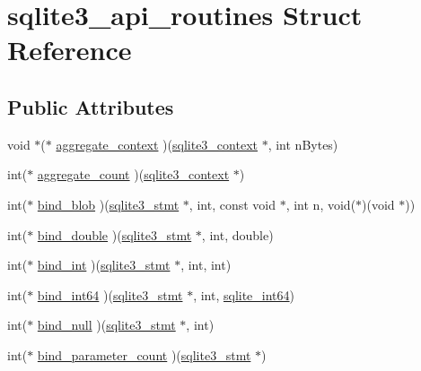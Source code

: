 \hypertarget{structsqlite3__api__routines}{\section{sqlite3\-\_\-api\-\_\-routines Struct Reference}
\label{structsqlite3__api__routines}
}
\subsection*{Public Attributes}
\begin{DoxyCompactItemize}
\item 
void $\ast$($\ast$ \hyperlink{structsqlite3__api__routines_a4af9ccf21e07862a8c3636c16d3acd19}{aggregate\-\_\-context} )(\hyperlink{structsqlite3__context}{sqlite3\-\_\-context} $\ast$, int n\-Bytes)
\item 
int($\ast$ \hyperlink{structsqlite3__api__routines_a8373f7a5dd2d6f1c86bbf024b1796156}{aggregate\-\_\-count} )(\hyperlink{structsqlite3__context}{sqlite3\-\_\-context} $\ast$)
\item 
int($\ast$ \hyperlink{structsqlite3__api__routines_afeb41d70ab5a221fec488560934c825b}{bind\-\_\-blob} )(\hyperlink{sqlite3_8c_af2a033da1327cdd77f0a174a09aedd0c}{sqlite3\-\_\-stmt} $\ast$, int, const void $\ast$, int n, void($\ast$)(void $\ast$))
\item 
int($\ast$ \hyperlink{structsqlite3__api__routines_aca43a229ce28397ba8c18a4d6e03e40c}{bind\-\_\-double} )(\hyperlink{sqlite3_8c_af2a033da1327cdd77f0a174a09aedd0c}{sqlite3\-\_\-stmt} $\ast$, int, double)
\item 
int($\ast$ \hyperlink{structsqlite3__api__routines_a6fef49e6c9c1fa573c55cc6668a8448f}{bind\-\_\-int} )(\hyperlink{sqlite3_8c_af2a033da1327cdd77f0a174a09aedd0c}{sqlite3\-\_\-stmt} $\ast$, int, int)
\item 
int($\ast$ \hyperlink{structsqlite3__api__routines_a489304cada65abca390da9b751da8800}{bind\-\_\-int64} )(\hyperlink{sqlite3_8c_af2a033da1327cdd77f0a174a09aedd0c}{sqlite3\-\_\-stmt} $\ast$, int, \hyperlink{sqlite3_8c_a520a95f9080c018b2fade39885bd2e2a}{sqlite\-\_\-int64})
\item 
int($\ast$ \hyperlink{structsqlite3__api__routines_a74d16d0bb57db37d654e95fb7e72c93c}{bind\-\_\-null} )(\hyperlink{sqlite3_8c_af2a033da1327cdd77f0a174a09aedd0c}{sqlite3\-\_\-stmt} $\ast$, int)
\item 
int($\ast$ \hyperlink{structsqlite3__api__routines_ab27285b7fb132f697d5ef22f21469dd6}{bind\-\_\-parameter\-\_\-count} )(\hyperlink{sqlite3_8c_af2a033da1327cdd77f0a174a09aedd0c}{sqlite3\-\_\-stmt} $\ast$)

\end{DoxyCompactItemize}
